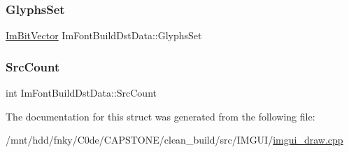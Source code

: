\subsubsection{\texorpdfstring{Glyphs\+Set}{GlyphsSet}}
{\footnotesize\ttfamily \hyperlink{structImBitVector}{Im\+Bit\+Vector} Im\+Font\+Build\+Dst\+Data\+::\+Glyphs\+Set}

\mbox{\label{structImFontBuildDstData_ab13d637daba34891db2968684647a728}} 
\subsubsection{\texorpdfstring{Src\+Count}{SrcCount}}
{\footnotesize\ttfamily int Im\+Font\+Build\+Dst\+Data\+::\+Src\+Count}



The documentation for this struct was generated from the following file\+:\begin{DoxyCompactItemize}
\item 
/mnt/hdd/fnky/\+C0de/\+C\+A\+P\+S\+T\+O\+N\+E/clean\+\_\+build/src/\+I\+M\+G\+U\+I/\hyperlink{imgui__draw_8cpp}{imgui\+\_\+draw.\+cpp}\end{DoxyCompactItemize}
